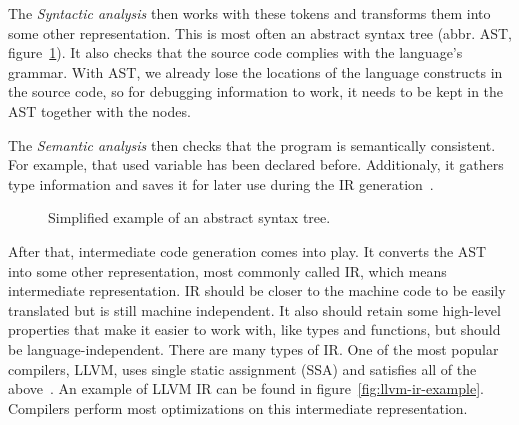 The \textit{Syntactic analysis} then works with these tokens and transforms
them into some other representation. This is most often an abstract syntax tree
(abbr. AST, figure~\ref{fig:ast}). It also checks that the source code complies
with the language's grammar. With AST, we already lose the locations of the
language constructs in the source code, so for debugging information to work,
it needs to be kept in the AST together with the nodes.

The \textit{Semantic analysis} then checks that the program is semantically
consistent. For example, that used variable has been declared before.
Additionaly, it gathers type information and saves it for later use during the
IR generation~\cite{dragon-book}.

\begin{figure}
    \centering
    \caption{Simplified example of an abstract syntax tree.}
    \label{fig:ast}
\end{figure}
 
After that, intermediate code generation comes into play. It converts the AST
into some other representation, most commonly called IR, which means
intermediate representation. IR should be closer to the machine code to be
easily translated but is still machine independent. It also should retain some
high-level properties that make it easier to work with, like types and
functions, but should be language-independent. There are many types of IR. One
of the most popular compilers, LLVM, uses single static assignment (SSA) and
satisfies all of the above~\cite{llvm}. An example of LLVM IR can be found in
figure~\ref{fig:llvm-ir-example}. Compilers perform most optimizations on this
intermediate representation. 

